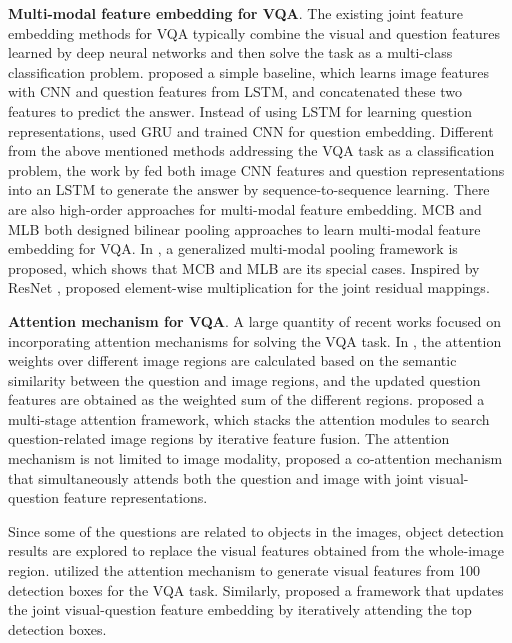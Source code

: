 \documentclass[letterpaper]{article}
\begin{document}
\textbf{Multi-modal feature embedding for VQA}. The existing joint feature embedding methods for VQA typically combine the visual and question features learned by deep neural networks and then solve the task as a multi-class classification problem. \cite{zhou2015simple} proposed a simple baseline, which learns image features with CNN and question features from LSTM, and concatenated these two features to predict the answer.
Instead of using LSTM for learning question representations, \cite{noh2016image} used GRU \cite{cho2014learning} and \cite{ma2016learning} trained CNN for question embedding.
Different from the above mentioned methods addressing the VQA task as a classification problem, the work by \cite{malinowski2015ask} fed both image CNN features and question representations into an LSTM to generate the answer by sequence-to-sequence learning.
There are also high-order approaches for multi-modal feature embedding. MCB \cite{fukui2016multimodal} and MLB \cite{kim2016hadamard} both designed  bilinear pooling approaches to learn multi-modal feature embedding for VQA. In \cite{benyounescadene2017mutan}, a generalized multi-modal pooling framework is proposed, which shows that MCB and MLB are its special cases. Inspired by ResNet \cite{he2016deep}, \cite{kim2016multimodal} proposed element-wise multiplication for the joint residual mappings.


\textbf{Attention mechanism for VQA}. A large quantity of recent works focused on incorporating attention mechanisms for solving the VQA task.
In \cite{xu2016ask}, the attention weights over different image regions are calculated based on the semantic similarity between the question and  image regions, and the updated question features are obtained as the weighted sum of the different regions.
\cite{yang2016stacked} proposed a multi-stage attention framework, which stacks the attention modules to search question-related image regions by iterative feature fusion. The attention mechanism is not limited to image modality, \cite{lu2016hierarchical} proposed a co-attention mechanism that simultaneously attends both the question and image with joint visual-question feature representations.

Since some of the questions are related to objects in the images, object detection results are explored to replace the visual features obtained from the whole-image region. \cite{shih2016look} utilized the attention mechanism to generate visual features from 100 detection boxes for the VQA task. Similarly, \cite{li2016visual} proposed a framework that updates the joint visual-question feature embedding by iteratively attending the top detection boxes.
\end{document}
